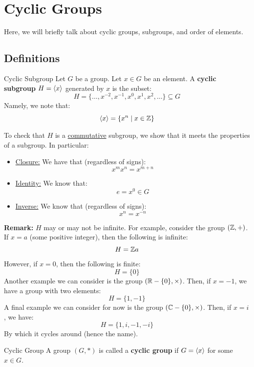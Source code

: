\documentclass[letterpaper]{article}
\begin{document}

\newpage 
\section{Cyclic Groups} 
Here, we will briefly talk about cyclic groups, subgroups, and order of elements.

\subsection{Definitions}
\begin{definition}{Cyclic Subgroup}{}
    Let $G$ be a group. Let $x \in G$ be an element. A \textbf{cyclic subgroup} $H = \langle x \rangle$ generated by $x$ is the subset: 
    \[H = \{\dots, x^{-2}, x^{-1}, x^0, x^1, x^2, \dots\} \subseteq G\]
    Namely, we note that: 
    \[\langle x \rangle = \{x^n \mid x \in \mathbb{Z}\}\]
\end{definition}

To check that $H$ is a \underline{commutative} subgroup, we show that it meets the properties of a subgroup. In particular:  
\begin{itemize}
    \item \underline{Closure:} We have that (regardless of signs): 
    \[x^m x^n = x^{m + n}\]

    \item \underline{Identity:} We know that: 
    \[e = x^0 \in G\]

    \item \underline{Inverse:} We know that (regardless of signs): 
    \[x^n = x^{-n}\]
\end{itemize}

\textbf{Remark:} $H$ may or may not be infinite. For example, consider the group $(\mathbb{Z}, +)$. If $x = a$ (some positive integer), then the following is infinite: 
\[H = \mathbb{Z} a\]
However, if $x = 0$, then the following is finite: 
\[H = \{0\}\] 
Another example we can consider is the group $(\mathbb{R} - \{0\}, \times)$. Then, if $x = -1$, we have a group with two elements: 
\[H = \{1, -1\}\]
A final example we can consider for now is the group $(\mathbb{C} - \{0\}, \times)$. Then, if $x = i$, we have: 
\[H = \{1, i, -1, -i\}\]
By which it cycles around (hence the name). 

\begin{definition}{Cyclic Group}{}
    A group $(G, *)$ is called a \textbf{cyclic group} if $G = \langle x \rangle$ for some $x \in G$. 
\end{definition}
\end{document}
